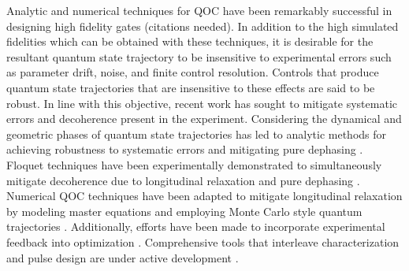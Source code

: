 \documentclass[
  amsfonts,
  amsmath,
  tbtags,
  amssymb,
  aps,
  nobibnotes,
  twocolumn,
  superscriptaddress,
]{revtex4-2}
\begin{document}
Analytic and numerical techniques for QOC have been remarkably successful in
designing high fidelity gates (citations needed). In addition to the high
simulated fidelities which can be obtained with these techniques, it is desirable for the
resultant quantum state trajectory to be insensitive to experimental errors
such as parameter drift, noise, and finite control resolution. Controls that produce
quantum state trajectories that are insensitive to these effects are said to be robust.
In line with this objective, recent work has sought to mitigate systematic errors
and decoherence present in the experiment.
Considering the dynamical and geometric phases of quantum state
trajectories has led to analytic methods for achieving
robustness to systematic errors and mitigating pure dephasing
\cite{han2020experimental, merrill2014progress, xu2020nonadiabatic, zhang2020universal}.
Floquet techniques have been experimentally demonstrated to simultaneously mitigate
decoherence due to longitudinal relaxation and pure dephasing
\cite{huang2020engineering, mundada2020floquet}.
Numerical QOC techniques have been adapted to mitigate longitudinal relaxation
by modeling master equations \cite{rembold2020introduction} and employing
Monte Carlo style quantum trajectories \cite{abdelhafez2019gradient}.
Additionally, efforts have been made to incorporate experimental feedback
into optimization \cite{huang2020engineering}. Comprehensive tools that interleave characterization
and pulse design are under active development \cite{wittler2020integrated}.
\end{document}
